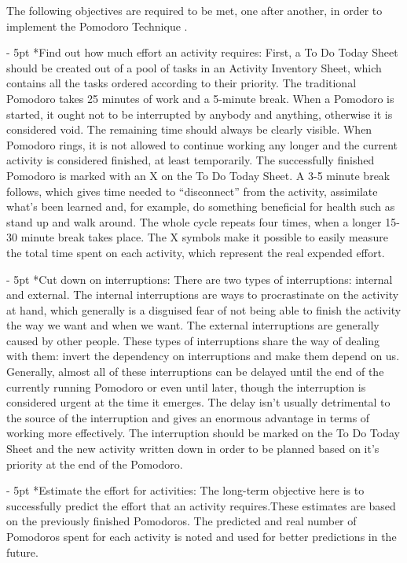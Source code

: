 \documentclass[11pt,singleside]{myfithesis2}
\makeatletter
\renewcommand\paragraph{
   \vspace{-10pt}
   \@startsection{paragraph}{4}{0mm}
      {\baselineskip}
      {- 5pt}
      {\normalfont\normalsize\bfseries}
}
\makeatother
\begin{document}
The following objectives are required to be met, one after another, in order to implement the Pomodoro Technique \cite{pomodoro}.
\paragraph*{Find out how much effort an activity requires: } First, a To Do Today Sheet should be created out of a pool of tasks in an Activity Inventory Sheet, which contains all the tasks ordered according to their priority. The traditional Pomodoro takes 25 minutes of work and a 5-minute break. When a Pomodoro is started, it ought not to be interrupted by anybody and anything, otherwise it is considered void. The remaining time should always be clearly visible. When Pomodoro rings, it is not allowed to continue working any longer and the current activity is considered finished, at least temporarily. The successfully finished Pomodoro is marked with an X on the To Do Today Sheet. A 3-5 minute break follows, which gives time needed to ``disconnect'' from the activity, assimilate what's been learned and, for example, do something beneficial for health such as stand up and walk around. The whole cycle repeats four times, when a longer 15-30 minute break takes place. The X symbols make it possible to easily measure the total time spent on each activity, which represent the real expended effort.
\paragraph*{Cut down on interruptions: } There are two types of interruptions: internal and external. The internal interruptions are ways to procrastinate on the activity at hand, which generally is a disguised fear of not being able to finish the activity the way we want and when we want. The external interruptions are generally caused by other people. These types of interruptions share the way of dealing with them: invert the dependency on interruptions and make them depend on us. Generally, almost all of these interruptions can be delayed until the end of the currently running Pomodoro or even until later, though the interruption is considered urgent at the time it emerges. The delay isn't usually detrimental to the source of the interruption and gives an enormous advantage in terms of working more effectively. The interruption should be marked on the To Do Today Sheet and the new activity written down in order to be planned based on it's priority at the end of the Pomodoro.
\paragraph*{Estimate the effort for activities: } The long-term objective here is to successfully predict the effort that an activity requires.These estimates are based on the previously finished Pomodoros. The predicted and real number of Pomodoros spent for each activity is noted and used for better predictions in the future.
\end{document}
